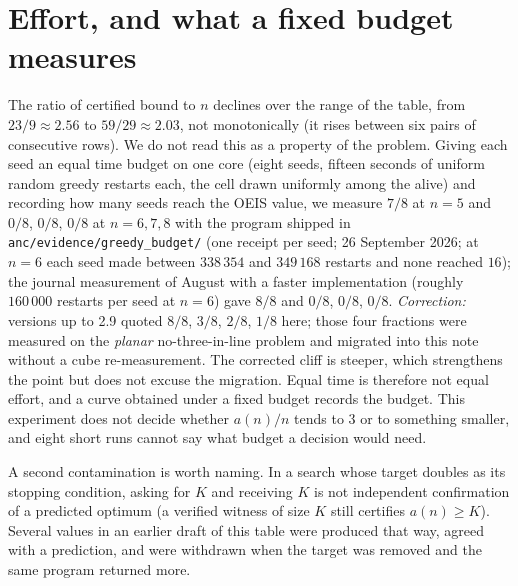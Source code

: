 \documentclass[11pt,a4paper]{article}
\begin{document}
\section{Effort, and what a fixed budget measures}\label{s:effort}
The ratio of certified bound to $n$ declines over the range of the table, from $23/9\approx2.56$ to $59/29\approx2.03$, not
monotonically (it rises between six pairs of consecutive rows).  We do not read this as a property of the problem.  Giving each seed an equal time budget on one core (eight seeds, fifteen seconds of uniform random
greedy restarts each, the cell drawn uniformly among the alive) and recording how many seeds reach
the OEIS value, we measure $7/8$ at $n=5$ and $0/8$, $0/8$, $0/8$ at $n=6,7,8$ with the program shipped in
\texttt{anc/evidence/greedy\_budget/} (one receipt per seed; 26 September 2026; at $n=6$ each seed made
between $338\,354$ and $349\,168$ restarts and none reached $16$); the journal measurement of August with a faster
implementation (roughly $160\,000$ restarts per seed at $n=6$) gave $8/8$ and $0/8$, $0/8$, $0/8$.  \emph{Correction:} versions up to 2.9 quoted
$8/8$, $3/8$, $2/8$, $1/8$ here; those four fractions were measured on the \emph{planar}
no-three-in-line problem and migrated into this note without a cube re-measurement.  The corrected
cliff is steeper, which strengthens the point but does not excuse the migration.
Equal time is therefore not equal effort, and a curve obtained under a fixed budget records the
budget.  This experiment does not decide whether $a(n)/n$ tends to $3$ or to something smaller,
and eight short runs cannot say what budget a decision would need.

A second contamination is worth naming.  In a search whose target doubles as its stopping
condition, asking for $K$ and receiving $K$ is not independent confirmation of a predicted optimum
(a verified witness of size $K$ still certifies $a(n)\ge K$).  Several values in an
earlier draft of this table were produced that way, agreed with a prediction, and were withdrawn
when the target was removed and the same program returned more.
\end{document}
